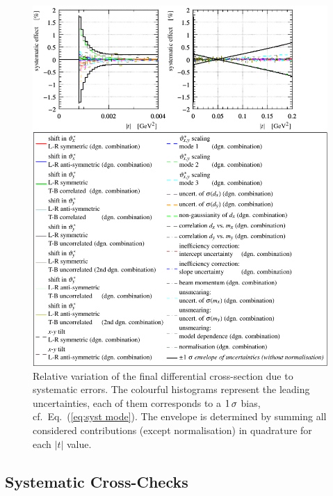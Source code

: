 \begin{figure}
\begin{center}
\includegraphics{fig/systematics_dgn_combination_summary.pdf}
\caption{%
Relative variation of the final differential cross-section due to systematic errors. The colourful histograms represent the leading uncertainties, each of them corresponds to a $1\,{\rm \sigma}$ bias, cf.~Eq.~(\ref{eq:syst mode}). The envelope is determined by summing all considered contributions (except normalisation) in quadrature for each $|t|$ value.
}
\label{fig:syst unc}
\end{center}
\end{figure}





\subsection{Systematic Cross-Checks}
\label{sec:cross checks}


